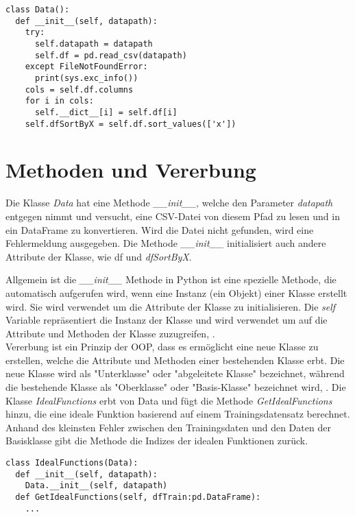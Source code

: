 \begin{lstlisting}[caption={class Data}, captionpos=b, label={lst:class data}]
class Data():
  def __init__(self, datapath):
    try:
      self.datapath = datapath
      self.df = pd.read_csv(datapath)
    except FileNotFoundError:
      print(sys.exc_info())
    cols = self.df.columns
    for i in cols:
      self.__dict__[i] = self.df[i]
    self.dfSortByX = self.df.sort_values(['x'])
\end{lstlisting}

\section{Methoden und Vererbung}
Die Klasse \textit{Data} hat eine Methode \textit{\_\_init\_\_}, welche den Parameter \textit{datapath} entgegen nimmt und versucht, eine CSV-Datei von diesem Pfad zu lesen und in ein DataFrame zu konvertieren. Wird die Datei nicht gefunden, wird eine Fehlermeldung ausgegeben. Die Methode \textit{\_\_init\_\_} initialisiert auch andere Attribute der Klasse, wie df und \textit{dfSortByX}.

Allgemein ist die \textit{\_\_init\_\_} Methode in Python ist eine spezielle Methode, die automatisch aufgerufen wird, wenn eine Instanz (ein Objekt) einer Klasse erstellt wird. Sie wird verwendet um die Attribute der Klasse zu initialisieren. Die \textit{self} Variable repräsentiert die Instanz der Klasse und wird verwendet um auf die Attribute und Methoden der Klasse zuzugreifen, \cite{Häberlein:2024}. \\

Vererbung ist ein Prinzip der OOP, dass es ermöglicht eine neue Klasse zu erstellen, welche die Attribute und Methoden einer bestehenden Klasse erbt. Die neue Klasse wird als "Unterklasse" oder "abgeleitete Klasse" bezeichnet, während die bestehende Klasse als "Oberklasse" oder "Basis-Klasse" bezeichnet wird, \cite{Steyer:2018}.
Die Klasse \textit{IdealFunctions} erbt von Data und fügt die Methode \textit{GetIdealFunctions} hinzu, die eine ideale Funktion basierend auf einem Trainingsdatensatz berechnet. Anhand des kleinsten Fehler zwischen den Trainingsdaten und den Daten der Basisklasse gibt die Methode die Indizes der idealen Funktionen zurück.

\begin{lstlisting}[caption={class IdealFunctions}, captionpos=b, label={lst:class IdealFcns}]
class IdealFunctions(Data):
  def __init__(self, datapath):
    Data.__init__(self, datapath)
  def GetIdealFunctions(self, dfTrain:pd.DataFrame):
    ...
\end{lstlisting}


